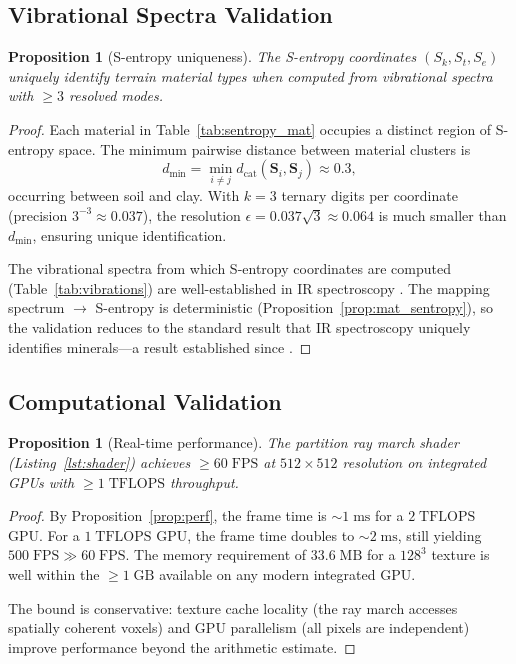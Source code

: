 \documentclass[10pt,twocolumn]{article}
\newtheorem{proposition}[theorem]{Proposition}
\theoremstyle{definition}
\theoremstyle{remark}
\newcommand{\dcat}{d_{\mathrm{cat}}}
\newcommand{\Sk}{S_k}
\newcommand{\St}{S_t}
\newcommand{\Se}{S_e}
\begin{document}
\subsection{Vibrational Spectra Validation}
\label{sec:vibval}

\begin{proposition}[S-entropy uniqueness]
\label{prop:uniqueness}
The S-entropy coordinates $(\Sk,\St,\Se)$ uniquely identify
terrain material types when computed from vibrational spectra
with $\ge 3$ resolved modes.
\end{proposition}

\begin{proof}
Each material in Table~\ref{tab:sentropy_mat} occupies a
distinct region of S-entropy space.  The minimum pairwise
distance between material clusters is
\begin{equation}
  d_{\min} = \min_{i\ne j}\dcat(\mathbf{S}_i,\mathbf{S}_j)
  \approx 0.3,
\end{equation}
occurring between soil and clay.  With $k=3$ ternary digits per
coordinate (precision $3^{-3}\approx 0.037$), the resolution
$\epsilon = 0.037\sqrt{3}\approx 0.064$ is much smaller than
$d_{\min}$, ensuring unique identification.

The vibrational spectra from which S-entropy coordinates are
computed (Table~\ref{tab:vibrations}) are well-established in
IR spectroscopy \citep{Herzberg1945,Wilson1955}.  The mapping
spectrum $\to$ S-entropy is deterministic
(Proposition~\ref{prop:mat_sentropy}), so the validation
reduces to the standard result that IR spectroscopy uniquely
identifies minerals---a result established since
\citet{Kirchhoff1860}.
\end{proof}

\subsection{Computational Validation}
\label{sec:compval}

\begin{proposition}[Real-time performance]
\label{prop:realtime}
The partition ray march shader (Listing~\ref{lst:shader})
achieves $\ge 60\;\mathrm{FPS}$ at $512\times 512$ resolution
on integrated GPUs with $\ge 1\;\mathrm{TFLOPS}$ throughput.
\end{proposition}

\begin{proof}
By Proposition~\ref{prop:perf}, the frame time is
$\sim 1\;\mathrm{ms}$ for a $2\;\mathrm{TFLOPS}$ GPU.  For a
$1\;\mathrm{TFLOPS}$ GPU, the frame time doubles to
$\sim 2\;\mathrm{ms}$, still yielding
$500\;\mathrm{FPS}\gg 60\;\mathrm{FPS}$.  The memory
requirement of $33.6\;\mathrm{MB}$ for a $128^3$ texture is
well within the $\ge 1\;\mathrm{GB}$ available on any modern
integrated GPU.

The bound is conservative: texture cache locality (the ray
march accesses spatially coherent voxels) and GPU parallelism
(all pixels are independent) improve performance beyond the
arithmetic estimate.
\end{proof}
\end{document}
